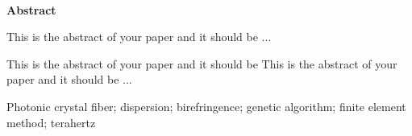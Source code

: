 \newpage\ \vspace{-2.5em}
\begin{center}
\textbf{Abstract}
\end{center}

\makeatletter
  \pagestyle{fancy}%
  \fancyhf{}
\makeatother


This is the abstract of your paper and it should be ...

This is the abstract of your paper and it should be This is the abstract of your paper and it should be ...


\begin{englishkeywords}
Photonic crystal fiber; dispersion; birefringence; genetic algorithm; finite element method; terahertz
\end{englishkeywords}

\cleardoublepage%

\makeatletter
{}
\pagestyle{fancy}
  \fancyhf{}
\makeatother
